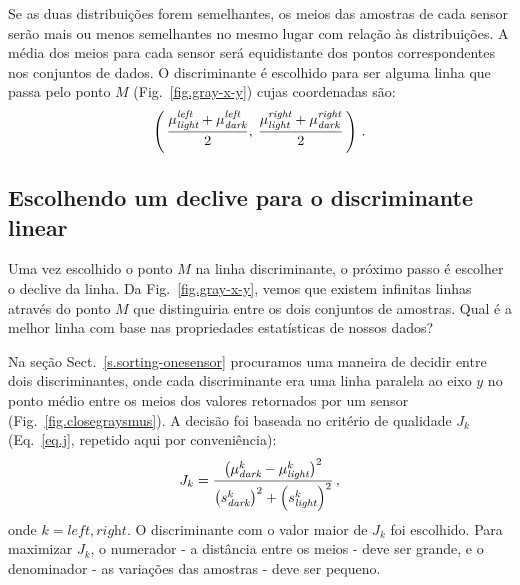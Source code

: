 Se as duas distribuições forem semelhantes, os meios das amostras de cada sensor serão mais ou menos semelhantes no mesmo lugar com relação às distribuições. A média dos meios para cada sensor será equidistante dos pontos correspondentes nos conjuntos de dados. O discriminante é escolhido para ser alguma linha que passa pelo ponto $M$ (Fig.~\ref{fig.gray-x-y}) cujas coordenadas são:
\[
\left(\,
\frac{\mu_{\textit{\scriptsize light}}^{\textit{\scriptsize left }}+\mu_{\textit{\scriptsize dark}}^{\textit{\scriptsize left }}}{2},\:\frac{\mu_{\textit{\scriptsize light}}^{\textit{\scriptsize right}}+\mu_{\textit{\scriptsize dark}}^{\textit{\scriptsize right}}}{2}
\,\right)\,.
\]

\subsection{Escolhendo um declive para o discriminante linear}

Uma vez escolhido o ponto $M$ na linha discriminante, o próximo passo é escolher o declive da linha. Da Fig.~\ref{fig.gray-x-y}, vemos que existem infinitas linhas através do ponto $M$ que distinguiria entre os dois conjuntos de amostras. Qual é a melhor linha com base nas propriedades estatísticas de nossos dados?

Na seção Sect.~\ref{s.sorting-onesensor} procuramos uma maneira de decidir entre dois discriminantes, onde cada discriminante era uma linha paralela ao eixo $y$ no ponto médio entre os meios dos valores retornados por um sensor (Fig.~\ref{fig.closegraysmus}). A decisão foi baseada no critério de qualidade $J_k$ (Eq.~\ref{eq.j}, repetido aqui por conveniência):
\begin{equation}
J_k = \frac{\left(\mu_{\textit{\scriptsize dark}}^k - \mu_{\textit{\scriptsize light}}^k\right)^2}{\left(s_{\textit{\scriptsize dark}}^k\right)^2 + \left(s_{\textit{\scriptsize light}}^k\right)^2}\,,\label{eq.j-repeat}
\end{equation}
onde $k=\textit{left},\textit{right}$. O discriminante com o valor maior de $J_k$ foi escolhido. Para maximizar $J_k$, o numerador - a distância entre os meios - deve ser grande, e o denominador - as variações das amostras - deve ser pequeno.

